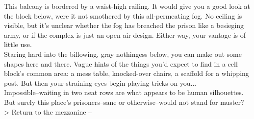 This balcony is bordered by a waist-high railing. It would give you a good look at the block below, were it not smothered by this all-permeating fog. No ceiling is visible, but it’s unclear whether the fog has breached the prison like a besieging army, or if the complex is just an open-air design. Either way, your vantage is of little use.\\

Staring hard into the billowing, gray nothingess below, you can make out some shapes here and there. Vague hints of the things you’d expect to find in a cell block’s common area: a mess table, knocked-over chairs, a scaffold for a whipping post. But then your straining eyes begin playing tricks on you...\\

Impossible--waiting in two neat rows are what appears to be human silhouettes. But surely this place’s prisoners--sane or otherwise--would not stand for muster?\\

> Return to the mezzanine -- 